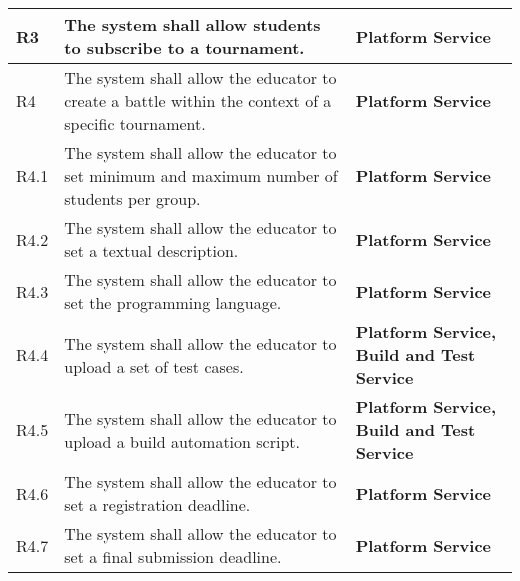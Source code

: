 \begin{center}
\begin{longtable}{|l|p{8cm}|p{5cm}|}
        R3    & The system shall allow students to subscribe to a tournament.                                                                                                                  & \textbf{Platform Service}                                                  \\\hline
        R4    & The system shall allow the educator to create a battle within the context of a specific tournament.                                                                            & \textbf{Platform Service}                                                  \\\hline
        R4.1  & The system shall allow the educator to set minimum and maximum number of students per group.                                                                                   & \textbf{Platform Service}                                                  \\\hline
        R4.2  & The system shall allow the educator to set a textual description.                                                                                                              & \textbf{Platform Service}                                                  \\\hline
        R4.3  & The system shall allow the educator to set the programming language.                                                                                                           & \textbf{Platform Service}                                                  \\\hline
        R4.4  & The system shall allow the educator to upload a set of test cases.                                                                                                             & \textbf{Platform Service, Build and Test Service}                          \\\hline
        R4.5  & The system shall allow the educator to upload a build automation script.                                                                                                       & \textbf{Platform Service, Build and Test Service}                          \\\hline
        R4.6  & The system shall allow the educator to set a registration deadline.                                                                                                            & \textbf{Platform Service}                                                  \\\hline
        R4.7  & The system shall allow the educator to set a final submission deadline.                                                                                                        & \textbf{Platform Service}                                                  \\\hline

\end{longtable}
\end{center}
